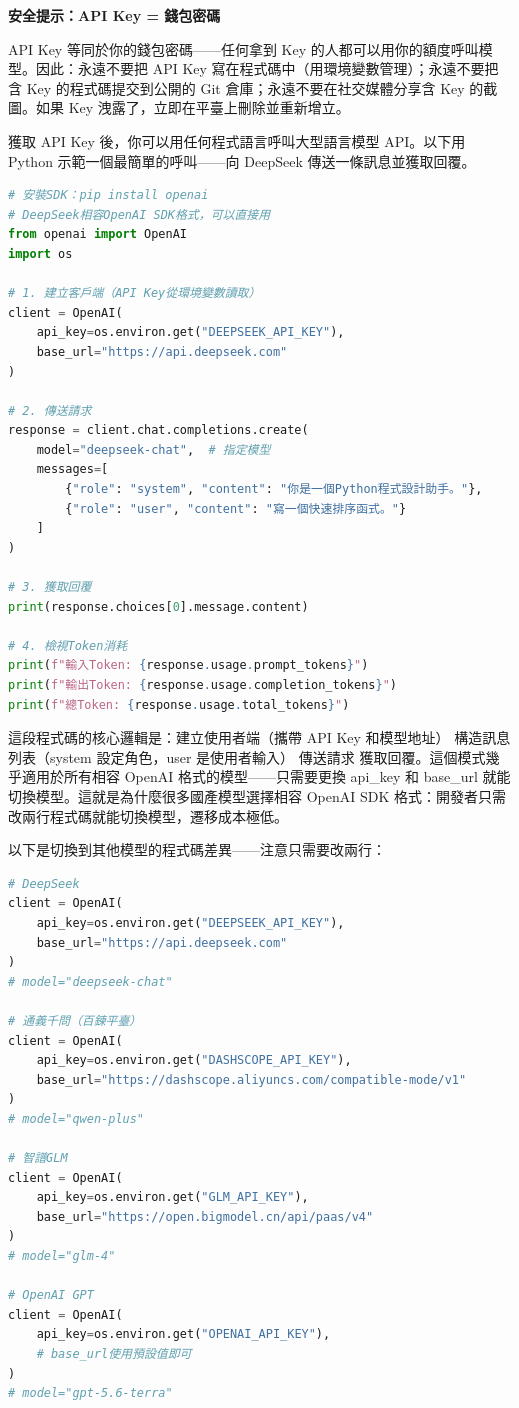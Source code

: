 \textbf{安全提示：API Key = 錢包密碼}\par

API Key 等同於你的錢包密碼——任何拿到 Key 的人都可以用你的額度呼叫模型。因此：永遠不要把 API Key 寫在程式碼中（用環境變數管理）；永遠不要把含 Key 的程式碼提交到公開的 Git 倉庫；永遠不要在社交媒體分享含 Key 的截圖。如果 Key 洩露了，立即在平臺上刪除並重新增立。


獲取 API Key 後，你可以用任何程式語言呼叫大型語言模型 API。以下用 Python 示範一個最簡單的呼叫——向 DeepSeek 傳送一條訊息並獲取回覆。

\begin{lstlisting}[language=Python]
# 安裝SDK：pip install openai
# DeepSeek相容OpenAI SDK格式，可以直接用
from openai import OpenAI
import os

# 1. 建立客戶端（API Key從環境變數讀取）
client = OpenAI(
    api_key=os.environ.get("DEEPSEEK_API_KEY"),
    base_url="https://api.deepseek.com"
)

# 2. 傳送請求
response = client.chat.completions.create(
    model="deepseek-chat",  # 指定模型
    messages=[
        {"role": "system", "content": "你是一個Python程式設計助手。"},
        {"role": "user", "content": "寫一個快速排序函式。"}
    ]
)

# 3. 獲取回覆
print(response.choices[0].message.content)

# 4. 檢視Token消耗
print(f"輸入Token: {response.usage.prompt_tokens}")
print(f"輸出Token: {response.usage.completion_tokens}")
print(f"總Token: {response.usage.total_tokens}")
\end{lstlisting}

這段程式碼的核心邏輯是：建立使用者端（攜帶 API Key 和模型地址） 構造訊息列表（system 設定角色，user 是使用者輸入） 傳送請求 獲取回覆。這個模式幾乎適用於所有相容 OpenAI 格式的模型——只需要更換 api\_key 和 base\_url 就能切換模型。這就是為什麼很多國產模型選擇相容 OpenAI SDK 格式：開發者只需改兩行程式碼就能切換模型，遷移成本極低。

以下是切換到其他模型的程式碼差異——注意只需要改兩行：

\begin{lstlisting}[language=Python]
# DeepSeek
client = OpenAI(
    api_key=os.environ.get("DEEPSEEK_API_KEY"),
    base_url="https://api.deepseek.com"
)
# model="deepseek-chat"

# 通義千問（百鍊平臺）
client = OpenAI(
    api_key=os.environ.get("DASHSCOPE_API_KEY"),
    base_url="https://dashscope.aliyuncs.com/compatible-mode/v1"
)
# model="qwen-plus"

# 智譜GLM
client = OpenAI(
    api_key=os.environ.get("GLM_API_KEY"),
    base_url="https://open.bigmodel.cn/api/paas/v4"
)
# model="glm-4"

# OpenAI GPT
client = OpenAI(
    api_key=os.environ.get("OPENAI_API_KEY"),
    # base_url使用預設值即可
)
# model="gpt-5.6-terra"
\end{lstlisting}

